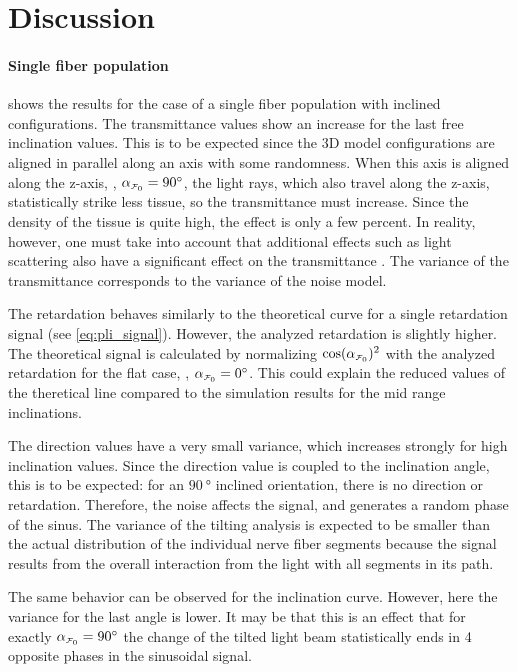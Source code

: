 \section{Discussion}
%
\paragraph{Single fiber population} 
 shows the results for the case of a single fiber population with inclined configurations.
The transmittance values show an increase for the last free inclination values.
This is to be expected since the 3D model configurations are aligned in parallel along an axis with some randomness.
When this axis is aligned along the z-axis, \ie{}, $\modelInc=\SI{90}{\degree}$, the light rays, which also travel along the z-axis, statistically strike less tissue, so the transmittance must increase.
Since the density of the tissue is quite high, the effect is only a few percent.
In reality, however, one must take into account that additional effects such as light scattering also have a significant effect on the transmittance \cite{Menzel2021}.
The variance of the transmittance corresponds to the variance of the noise model.
\par
%
The retardation behaves similarly to the theoretical curve for a single retardation signal (see \cref{eq:pli_signal}).
However, the analyzed retardation is slightly higher.
The theoretical signal is calculated by normalizing $\cos(\modelInc)^2$ with the analyzed retardation for the flat case, \ie{}, $\modelInc = \SI{0}{\degree}$.
This could explain the reduced values of the theretical line compared to the simulation results for the mid range inclinations.
\par
%
The direction values have a very small variance, which increases strongly for high inclination values.
Since the direction value is coupled to the inclination angle, this is to be expected: for an $\SI{90}{\degree}$ inclined orientation, there is no direction or retardation.
Therefore, the noise affects the signal, and generates a random phase of the sinus.
The variance of the tilting analysis is expected to be smaller than the actual distribution of the individual nerve fiber segments because the signal results from the overall interaction from the light with all segments in its path.
\par
%
The same behavior can be observed for the inclination curve.
However, here the variance for the last angle is lower.
It may be that this is an effect that for exactly $\modelInc=\SI{90}{\degree}$ the change of the tilted light beam statistically ends in 4 opposite phases in the sinusoidal signal.
